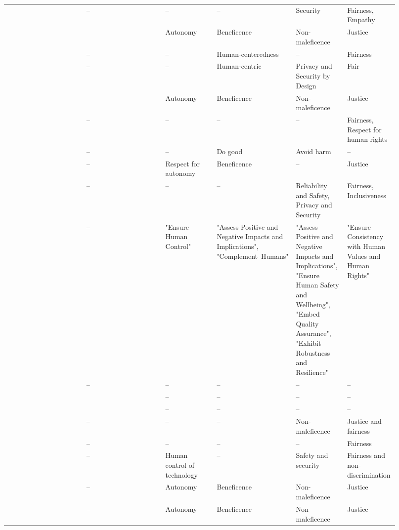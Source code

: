 \begin{landscape}
\begin{ThreePartTable}
\begin{longtable}{P{0.2\linewidth}P{0.2\linewidth}P{0.13\linewidth}P{0.13\linewidth}P{0.13\linewidth}P{0.13\linewidth}}
        \textcite{Anagnostou_2022} & -- & -- & -- & Security & Fairness, Empathy \\ 
        \textcite{Balagué_2021} & \textcite{Beauchamp_2001} & Autonomy & Beneficence & Non-maleficence & Justice \\
        \textcite{BarredoArrieta_2020} & -- & -- & Human-centeredness & -- & Fairness \\ 
        \textcite{Benjamins_2019} & -- & -- & Human-centric & Privacy and Security by Design & Fair \\ 
        \textcite{Borda_2022} & \textcite{Floridi_2018} & Autonomy & Beneficence & Non-maleficence & Justice \\ 
        \textcite{Brand_2022} & -- & -- & -- & -- & Fairness, Respect for human rights \\ 
        \textcite{Buhmann_2021} & -- & -- & Do good & Avoid harm & -- \\ 
        \textcite{Canca_2020} & -- & Respect for autonomy & Beneficence & -- & Justice \\ 
        \textcite{Cheng_2021} & -- & -- & -- & Reliability and Safety, Privacy and Security & Fairness, Inclusiveness \\ 
        \textcite{Clarke_2019} & -- & "Ensure Human \mbox{Control}" & "Assess Positive and Negative Impacts and Implications", "\mbox{Complement Humans}" & "Assess Positive and Negative Impacts and Implications", "\mbox{Ensure} Human Safety and Wellbeing", "Embed Quality Assurance", "Exhibit Robustness and Resilience" & "\mbox{Ensure} Consistency with Human Values and Human Rights" \\ 
        \textcite{Dignum_2017} & -- & -- & -- & -- & -- \\ 
        \textcite{Dignum_2019} & \textcite{Dignum_2017} & -- & -- & -- & -- \\ 
        \textcite{Dignum_2021} & \textcite{Dignum_2017} & -- & -- & -- & -- \\ 
        \textcite{Doorn_2021} & -- & -- & -- & Non-maleficence & Justice and fairness \\ 
        \textcite{Eitel-Porter_2021} & -- & -- & -- & -- & Fairness \\ 
        \textcite{Fjeld_2020} & -- & Human control of \mbox{technology} & -- & Safety and security & Fairness and \mbox{non-discrimination} \\ 
        \textcite{Floridi_2018} & -- & Autonomy & Beneficence & Non-maleficence & Justice \\ 
        \textcite{Floridi_2019} & -- & Autonomy & Beneficence & Non-maleficence & Justice \\ 

\end{longtable}
\end{ThreePartTable}
\end{landscape}
